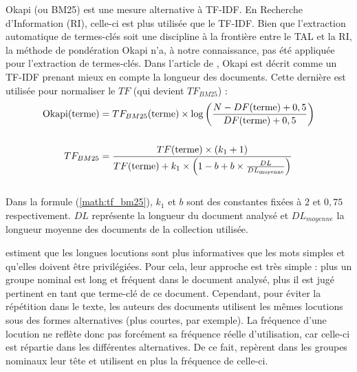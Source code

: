           Okapi (ou BM25) \citep{robertson1999okapi} est une mesure alternative à
          TF-IDF. En Recherche d'Information (RI), celle-ci est plus utilisée que le
          TF-IDF. Bien que l'extraction automatique de termes-clés soit une
          discipline à la frontière entre le TAL et la RI, la méthode de pondération
          Okapi n'a, à notre connaissance, pas été appliquée pour l'extraction de
          termes-clés. Dans l'article de \citet{claveau2012vectorisation}, Okapi est
          décrit comme un TF-IDF prenant mieux en compte la longueur des documents.
          Cette dernière est utilisée pour normaliser le $TF$ (qui devient
          $TF_{BM25}$) :
          \begin{align}
            \text{Okapi}(\text{terme}) &= TF_{BM25}(\text{terme}) \times \log\left(\frac{N - DF(\text{terme}) + 0,5}{DF(\text{terme}) + 0,5}\right) \label{math:okapi}\\
            \notag\\
            TF_{BM25} &= \frac{TF(\text{terme}) \times (k_1 + 1)}{TF(\text{terme}) + k_1 \times \left(1 - b + b \times \frac{DL}{DL_{\text{moyenne}}}\right)} \label{math:tf_bm25}
          \end{align}\\
          Dans la formule (\ref{math:tf_bm25}), $k_1$ et $b$ sont des constantes
          fixées à $2$ et $0,75$ respectivement. $DL$ représente la longueur du
          document analysé et $DL_{moyenne}$ la longueur moyenne des documents de la
          collection utilisée.

          \citet{barker2000nounphrasehead} estiment que les longues locutions sont
          plus informatives que les mots simples et qu'elles doivent être privilégiées.
          Pour cela, leur approche est très simple : plus un groupe nominal est long
          et fréquent dans le document analysé, plus il est jugé pertinent en tant
          que terme-clé de ce document. Cependant, pour éviter la répétition dans le
          texte, les auteurs des documents utilisent les mêmes locutions sous des
          formes alternatives (plus courtes, par exemple). La fréquence d'une locution
          ne reflète donc pas forcément sa fréquence réelle
          d'utilisation, car celle-ci est répartie dans les différentes
          alternatives. De ce fait, \citet{barker2000nounphrasehead} repèrent dans
          les groupes nominaux leur tête et utilisent en plus la fréquence de
          celle-ci.

